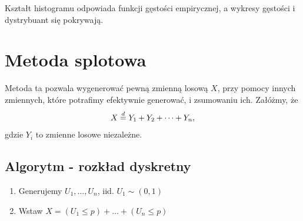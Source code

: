 \documentclass[12pt]{mwart}
\begin{document}
	
		\begin{figure} [H]
			\centering 
		\end{figure}
	
	
	
 	\noindent Kształt histogramu odpowiada funkcji gęstości empirycznej, a wykresy gęstości i dystrybuant się pokrywają.
   
 	\section{Metoda splotowa}
 	\noindent Metoda ta pozwala wygenerować pewną zmienną losową $X$, przy pomocy innych zmiennych, które potrafimy efektywnie generować, i zsumowaniu ich. Załóżmy, że
 	$$ X \buildrel{d} \over{=} Y_1 + Y_2 + \dots + Y_n, $$
 	gdzie $Y_i$ to zmienne losowe niezależne. 
 	
 	
 	\subsection{Algorytm - rozkład dyskretny}
 	\begin{enumerate}
 		\item Generujemy $U_1, \ldots, U_n$, iid. $U_1 \sim (0,1)$
 		\item Wstaw $ X = (U_1 \leqslant p) + \ldots + (U_n \leqslant p)$ \\ 
 	\end{enumerate} 
 	
\end{document}
